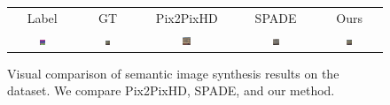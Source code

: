 \addtolength{\tabcolsep}{-4.5pt}    
\bgroup
\def\arraystretch{0.5}%
\begin{figure}[]
\small
\begin{tabular} {cc|cc|c}
 Label & GT & Pix2PixHD &  SPADE & Ours\\

\includegraphics[width=0.09\textwidth]{Images/Rec/FACADES/label/Austria_Vienna_way175776886_Fid1698_QhErsGwv-5YJ9ZlTvv1I8w.png} & \includegraphics[width=0.09\textwidth]{Images/Rec/FACADES/gt/Austria_Vienna_way175776886_Fid1698_QhErsGwv-5YJ9ZlTvv1I8w.jpg} &
\includegraphics[width=0.09\textwidth]{Images/Rec/FACADES/pix2pixhd/Austria_Vienna_way175776886_Fid1698_QhErsGwv-5YJ9ZlTvv1I8w.jpg}&
\includegraphics[width=0.09\textwidth]{Images/Rec/FACADES/spade/Austria_Vienna_way175776886_Fid1698_QhErsGwv-5YJ9ZlTvv1I8w.jpg} &  \includegraphics[width=0.09\textwidth]{Images/Rec/FACADES/ours/Austria_Vienna_way175776886_Fid1698_QhErsGwv-5YJ9ZlTvv1I8w.png} \\


\end{tabular}
\vspace{-2mm}
	\caption{Visual  comparison  of  semantic  image  synthesis  results  on  the \Facades dataset. We compare Pix2PixHD, SPADE, and our method.}
	\label{fig:FACADES results}		
\vspace{-3mm}	
 \end{figure}
 \egroup
 \addtolength{\tabcolsep}{4.5pt}